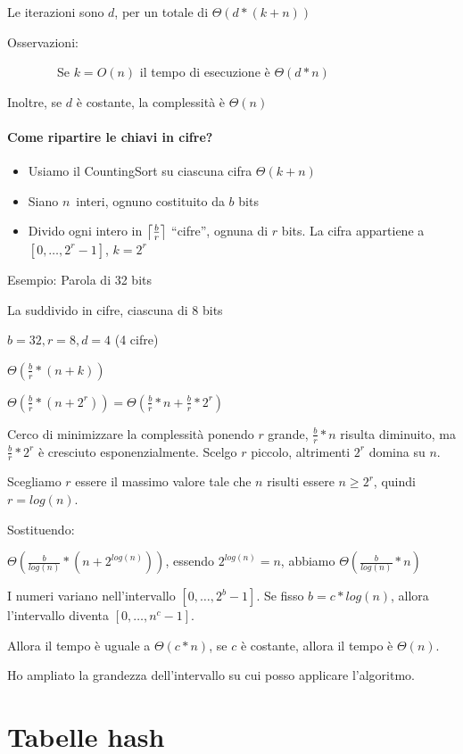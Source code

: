 \documentclass[tikz]{article}
\DeclarePairedDelimiter\ceil{\lceil}{\rceil}
\providecommand{\tightlist}{%
  \setlength{\itemsep}{0pt}\setlength{\parskip}{0pt}}
\let\oldparagraph\paragraph
\renewcommand{\paragraph}[1]{\oldparagraph{#1}\mbox{}}
\begin{document}
{Le iterazioni sono $d$, per un totale di $\Theta(d*(k+n))$}

{Osservazioni:}

{~~~~~~~~Se $k=O(n)$ il tempo di esecuzione è $\Theta(d*n)$}

{Inoltre, se $d$ è costante, la complessità è $\Theta(n)$}

\paragraph{Come ripartire le chiavi in cifre?}

\begin{itemize}
\tightlist
\item
  {Usiamo il CountingSort su ciascuna cifra $\Theta(k+n)$}
\item
  {Siano }$n${~interi, ognuno costituito da $b$ bits}
\item
  {Divido ogni intero in $\ceil*{\frac{b}{r}}$ ``cifre'', ognuna di $r$ bits. La cifra appartiene a $[0,\ldots,2^r-1]$, $k=2^r$}
\end{itemize}

{Esempio: Parola di 32 bits}

{La suddivido in cifre, ciascuna di 8 bits}

$b=32, r=8, d=4$ (4 cifre)

$\Theta(\frac{b}{r}*(n+k))$

$\Theta(\frac{b}{r}*(n+2^r)) = \Theta(\frac{b}{r}*n + \frac{b}{r}*2^r)$

{Cerco di minimizzare la complessità ponendo $r$ grande, $\frac{b}{r}*n$ risulta diminuito, ma $\frac{b}{r}*2^r$ è cresciuto esponenzialmente. Scelgo $r$ piccolo, altrimenti $2^r$ domina su $n$.}

{Scegliamo $r$ essere il massimo valore tale che $n$ risulti essere $n\geq 2^r$, quindi $r=log(n)$.}

{Sostituendo:}

{$\Theta(\frac{b}{log(n)}*(n+2^{log(n)}))$, essendo $2^{log(n)} = n$, abbiamo $\Theta(\frac{b}{log(n)}*n)$}

{I numeri variano nell'intervallo $[0,\ldots,2^b-1]$. Se fisso $b=c*log(n)$, allora l'intervallo diventa $[0,\ldots,n^c-1]$.}

{Allora il tempo è uguale a $\Theta(c*n)$, se $c$ è costante, allora il tempo è $\Theta(n)$.}

{Ho ampliato la grandezza dell'intervallo su cui posso applicare l'algoritmo.}

\section{Tabelle hash}
\end{document}
